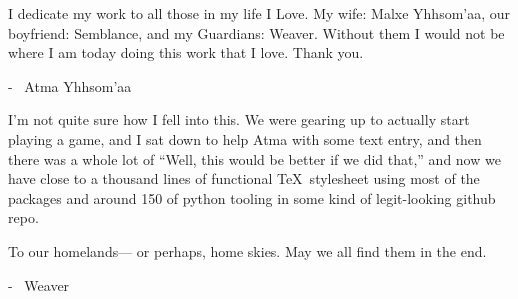 \begin{multicols}{2}
I dedicate my work to all those in my life I Love.  My wife: Malxe Yhhsom'aa, our boyfriend: Semblance, and my Guardians: Weaver.  Without them I would not be where I am today doing this work that I love.  Thank you. \pc%

- {\ferrum\ Atma Yhhsom'aa}\pw%

I'm not quite sure how I fell into this. We were gearing up to actually start playing a game, and I sat down to help Atma with some text entry, and then there was a whole lot of ``Well, this would be better if we did that,'' and now we have close to a thousand lines of functional \TeX\ stylesheet using most of the packages and around 150 of python tooling in some kind of legit-looking github repo.\pc%

To our homelands--- or perhaps, home skies. May we all find them in the end.\pc%

- {\ferrum\ Weaver}%
\end{multicols}